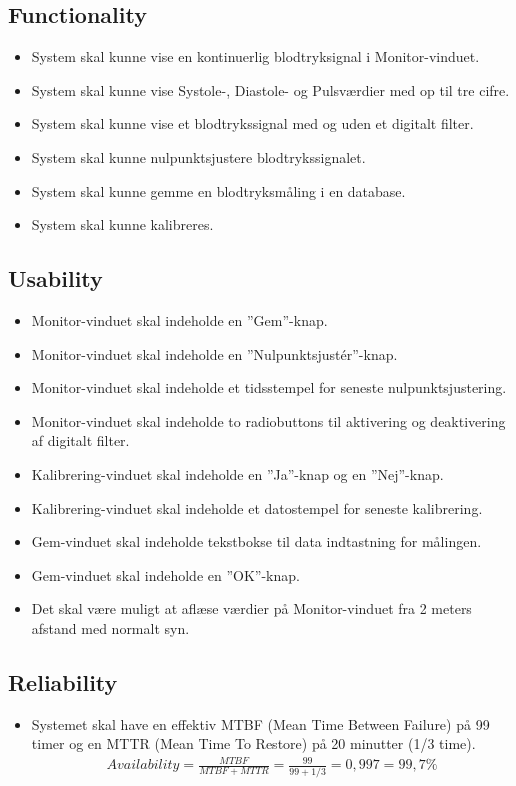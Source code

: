 \subsection{Functionality}
\begin{itemize}
	\item System skal kunne vise en kontinuerlig blodtryksignal i Monitor-vinduet.
	\item System skal kunne vise Systole-, Diastole- og Pulsværdier med op til tre cifre.
	\item System skal kunne vise et blodtrykssignal med og uden et digitalt filter.
	\item System skal kunne nulpunktsjustere blodtrykssignalet.
	\item System skal kunne gemme en blodtryksmåling i en database.
	\item System skal kunne kalibreres. 
\end{itemize}

\subsection{Usability}
\begin{itemize}
	\item Monitor-vinduet skal indeholde en ”Gem”\--knap.
	\item Monitor-vinduet skal indeholde en ”Nulpunktsjustér”\--knap.
	\item Monitor-vinduet skal indeholde et tidsstempel for seneste nulpunktsjustering.
	\item Monitor-vinduet skal indeholde to radiobuttons til aktivering og deaktivering af digitalt filter.
	\item Kalibrering-vinduet skal indeholde en ”Ja”\--knap og en ”Nej”\--knap.
	\item Kalibrering-vinduet skal indeholde et datostempel for seneste kalibrering.
	\item Gem-vinduet skal indeholde tekstbokse til data indtastning for målingen. 
	\item Gem-vinduet skal indeholde en ”OK”\--knap.
	\item Det skal være muligt at aflæse værdier på Monitor-vinduet fra 2 meters afstand med normalt syn.
\end{itemize}

\subsection{Reliability}
\begin{itemize}
	\item Systemet skal have en effektiv MTBF (Mean Time Between Failure) på 99 timer og en MTTR (Mean Time To Restore) på 20 minutter (1/3 time).
				\begin{align}
					Availability = \frac{MTBF}{MTBF+MTTR} = \frac{99}{99+1/3} = 0,997 = 99,7 \%
				\end{align}

\end{itemize}

